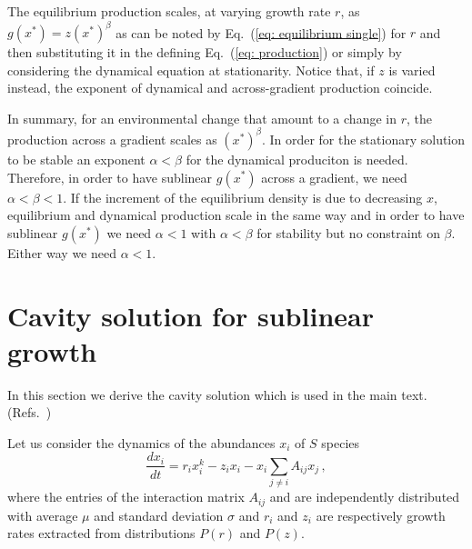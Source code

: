 \documentclass[10pt]{article}
\begin{document}
The equilibrium production scales, at varying growth rate $r$,
as $g(x^*)=z(x^*)^\beta$ as can be noted by Eq.~(\ref{eq: equilibrium single})
for $r$ and then substituting it in the defining Eq.~(\ref{eq: production})
or simply by considering the dynamical equation at stationarity.
Notice that, if $z$ is varied instead, the exponent
of dynamical and across-gradient production coincide.

In summary, for an environmental change that amount to a change in $r$, 
the production across a gradient 
scales as $(x^*)^\beta$. In order for
the stationary solution to be stable an exponent $\alpha<\beta$
for the dynamical produciton is needed.
Therefore, in order to have sublinear $g(x^*)$ across a gradient,
we need $\alpha<\beta<1$.
If the increment of the equilibrium density is due to decreasing $x$,
equilibrium and dynamical production scale in the same way and in order to
have sublinear $g(x^*)$ we need $\alpha<1$ with $\alpha<\beta$ for stability
but no constraint on $\beta$. Either way we need $\alpha<1$.

\section{Cavity solution for sublinear growth}
\label{sec: cavity solution}
In this section we derive the cavity solution which is used in the main text.
(Refs.~\cite{Bunin2017,Barbier18,Barbier17,Advani2018,Cui2020,Roy2019})

Let us consider the dynamics of the abundances $x_i$ of $S$ species
\begin{equation}
    \frac{d x_i}{dt} = r_ix_i^k - z_ix_i - x_i\sum_{j\neq i}A_{ij}x_j\, ,
    \label{eq: full system}
\end{equation}
where the entries of the interaction matrix $A_{ij}$
and are independently distributed with average $\mu$ and standard deviation $\sigma$
and $r_i$ and $z_i$ are respectively growth rates 
extracted from distributions $P(r)$ and $P(z)$. 
\end{document}
